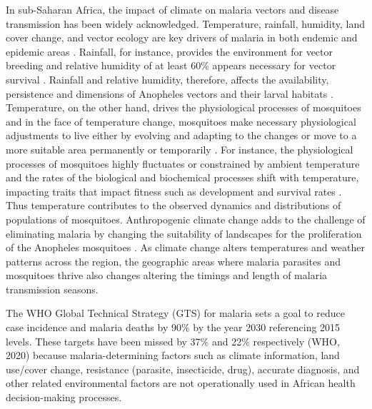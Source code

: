 \documentclass[utf8]{FrontiersinHarvard} %
\begin{document}
In sub-Saharan Africa, the impact of climate on malaria vectors and disease transmission has been widely acknowledged. Temperature, rainfall, humidity, land cover change, and vector ecology are key drivers of malaria in both endemic and epidemic areas \citep{yamba2023climate,yamba2020monthly}. Rainfall, for instance, provides the environment for vector breeding and relative humidity of at least 60\% appears necessary for vector survival \citep{ermert2011development, tompkins2013regional}. Rainfall and relative humidity, therefore, affects the availability, persistence and dimensions of Anopheles vectors and their larval habitats \citep{tompkins2013regional,asare2016breeding}. Temperature, on the other hand, drives the physiological processes of mosquitoes and in the face of temperature change, mosquitoes make necessary physiological adjustments to live either by evolving and adapting to the changes or move to a more suitable area permanently or temporarily \citep{buckley2016extreme,villena2022temperature,ryan2023mapping}. For instance, the physiological processes of mosquitoes highly fluctuates or constrained by ambient temperature and the rates of the biological and biochemical processes shift with temperature, impacting traits that impact fitness such as development and survival rates \citep{villena2022temperature,abram2017behavioural}. Thus temperature contributes to the observed dynamics and distributions of populations of mosquitoes. Anthropogenic climate change adds to the challenge of eliminating malaria by changing the suitability of landscapes for the proliferation of the Anopheles mosquitoes \citep{colon2021projecting}. As climate change alters temperatures and weather patterns across the region, the geographic areas where malaria parasites and  mosquitoes thrive also changes altering the timings and length of malaria transmission seasons. 



The WHO Global Technical Strategy (GTS) for malaria sets a goal to reduce case incidence and malaria deaths by 90\% by the year 2030 referencing 2015 levels. These targets have been missed by 37\% and 22\% respectively (WHO, 2020) because malaria-determining factors such as climate information, land use/cover change, resistance (parasite, insecticide, drug), accurate diagnosis, and other related environmental factors are not operationally used in African health decision-making processes.
\end{document}
